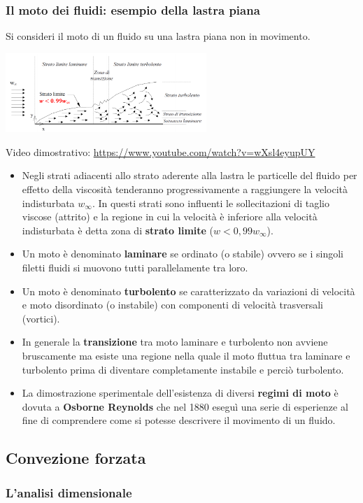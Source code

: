 \subsubsection{Il moto dei fluidi: esempio della lastra piana}
Si consideri il moto di un fluido su una lastra piana non in movimento.
\begin{center}
    \includegraphics[height=3cm]{../L11/img1.PNG}
\end{center}
Video dimostrativo: \url{https://www.youtube.com/watch?v=wXsl4eyupUY}\newline
\newline
\begin{itemize}
    \item Negli strati adiacenti allo strato aderente alla lastra le particelle del fluido per
    effetto della viscosità tenderanno progressivamente a raggiungere la velocità
    indisturbata $w_{\infty}$. In questi strati sono influenti le sollecitazioni di taglio viscose
    (attrito) e la regione in cui la velocità è inferiore alla velocità indisturbata è
    detta zona di \textbf{strato limite} ($w < 0,99 w_{\infty}$).
    \item Un moto è denominato \textbf{laminare} se ordinato (o stabile) ovvero se i singoli filetti fluidi si muovono tutti parallelamente tra loro.
    \item Un moto è denominato \textbf{turbolento} se caratterizzato da variazioni di velocità e moto disordinato (o instabile) con componenti di velocità trasversali (vortici).
    \item In generale la \textbf{transizione} tra moto laminare e turbolento non avviene bruscamente ma esiste una regione nella quale il moto fluttua tra laminare e turbolento prima di diventare completamente instabile e perciò turbolento.
    \item La dimostrazione sperimentale dell'esistenza di diversi \textbf{regimi di moto} è dovuta a \textbf{Osborne Reynolds} che nel 1880 eseguì una serie di esperienze al fine di comprendere come si potesse descrivere il movimento di un fluido.
\end{itemize}
\subsection{Convezione forzata}
\subsubsection{L'analisi dimensionale}